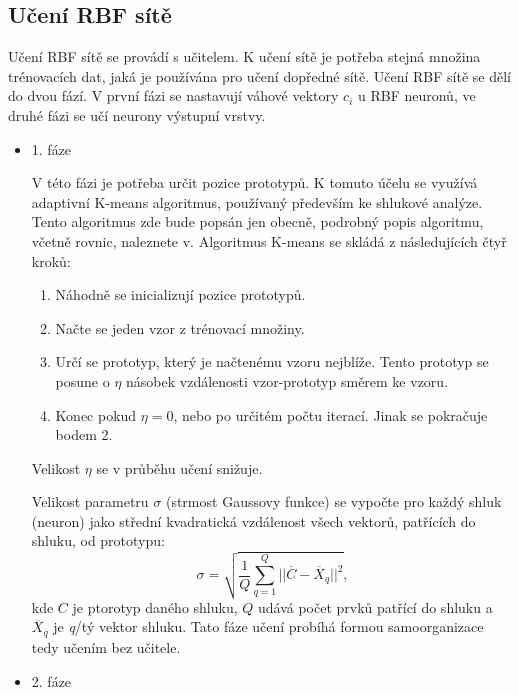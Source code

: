 \documentclass[11pt,twoside,a4paper]{book}
\begin{document}
\subsection{Učení RBF sítě}
Učení RBF sítě se provádí s učitelem. K učení sítě je potřeba stejná množina trénovacích dat, jaká je používána pro učení dopředné sítě. Učení RBF sítě se dělí do dvou fází.\cite{skripta} V první fázi se nastavují váhové vektory \begin{math}c_{i}\end{math} u RBF neuronů, ve druhé fázi se učí neurony výstupní vrstvy.
\begin{itemize}
\item 1. fáze

V této fázi je potřeba určit pozice prototypů. K tomuto účelu se využívá adaptivní K-means algoritmus, používaný především ke shlukové analýze. Tento algoritmus zde bude popsán jen obecně, podrobný popis algoritmu, včetně rovnic, naleznete v\cite{skripta}. Algoritmus K-means se skládá z následujících čtyř kroků:
\begin{enumerate}
\item Náhodně se inicializují pozice prototypů.
\item Načte se jeden vzor z trénovací množiny.
\item Určí se prototyp, který je načtenému vzoru nejblíže. Tento prototyp se posune o \begin{math}\eta\end{math} násobek vzdálenosti vzor-prototyp směrem ke vzoru.
\item Konec pokud \begin{math}\eta =0\end{math}, nebo po určitém počtu iterací. Jinak se pokračuje bodem 2.
\end{enumerate}
Velikost \begin{math}\eta\end{math} se v průběhu učení snižuje.

Velikost parametru \begin{math}\sigma\end{math} (strmost Gaussovy funkce) se vypočte pro každý shluk (neuron) jako střední kvadratická vzdálenost všech vektorů, patřících do shluku, od prototypu:
\begin{equation}
\sigma =\sqrt{\frac{1}{Q}\sum\limits_{q=1}^Q||\overline{C}-\overline{X}_{q}||^{2}} \mbox{,}
\end{equation}
kde \begin{math}C\end{math} je ptorotyp daného shluku, \begin{math}Q\end{math} udává počet prvků patřící do shluku a \begin{math}\overline{X}_{q}\end{math} je \textit{q}/tý vektor shluku.
Tato fáze učení probíhá formou samoorganizace tedy učením bez učitele.   
\item 2. fáze 


\end{itemize}
\end{document}
